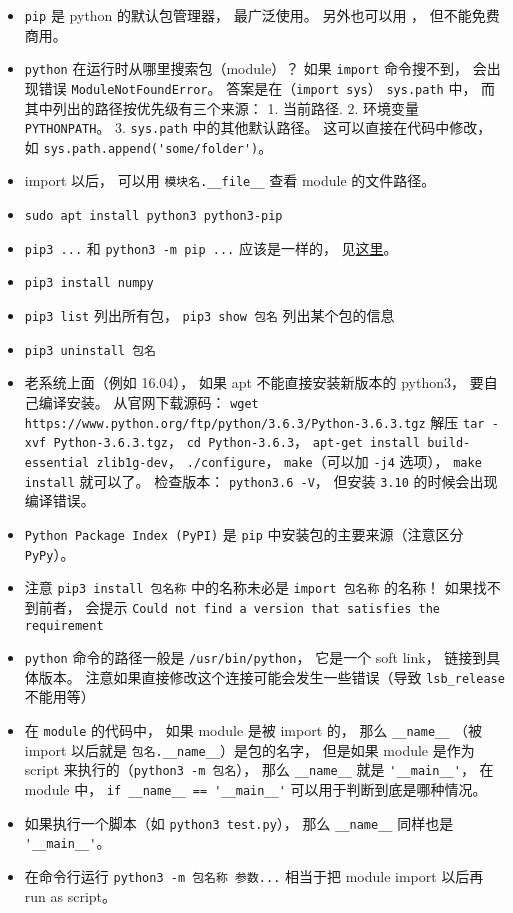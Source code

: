 

\begin{itemize}
\item \verb`pip` 是 python 的默认包管理器， 最广泛使用。 另外也可以用 ， 但不能免费商用。
\item \verb`python` 在运行时从哪里搜索包（module）？ 如果 \verb`import` 命令搜不到， 会出现错误 \verb`ModuleNotFoundError`。 答案是在（\verb`import sys`） \verb`sys.path` 中， 而其中列出的路径按优先级有三个来源： 1. 当前路径. 2. 环境变量 \verb`PYTHONPATH`。 3. \verb`sys.path` 中的其他默认路径。 这可以直接在代码中修改， 如 \verb`sys.path.append('some/folder')`。
\item import 以后， 可以用 \verb`模块名.__file__` 查看 module 的文件路径。
\item \verb`sudo apt install python3 python3-pip`
\item \verb`pip3 ...` 和 \verb`python3 -m pip ...` 应该是一样的， 见\href{https://stackoverflow.com/questions/41307101/difference-between-pip3-and-python3-m-pip}{这里}。
\item \verb`pip3 install numpy`
\item \verb`pip3 list` 列出所有包， \verb`pip3 show 包名` 列出某个包的信息
\item \verb`pip3 uninstall 包名`
\item 老系统上面（例如 16.04）， 如果 apt 不能直接安装新版本的 python3， 要自己编译安装。 从官网下载源码： \verb`wget https://www.python.org/ftp/python/3.6.3/Python-3.6.3.tgz` 解压 \verb`tar -xvf Python-3.6.3.tgz`， \verb`cd Python-3.6.3`， \verb`apt-get install build-essential zlib1g-dev`， \verb`./configure`， \verb`make`（可以加 \verb`-j4` 选项）， \verb`make install` 就可以了。 检查版本： \verb`python3.6 -V`， 但安装 \verb`3.10` 的时候会出现编译错误。
\item \verb`Python Package Index (PyPI)` 是 \verb`pip` 中安装包的主要来源（注意区分 \verb`PyPy`）。
\item 注意 \verb`pip3 install 包名称` 中的名称未必是 \verb`import 包名称` 的名称！ 如果找不到前者， 会提示 \verb`Could not find a version that satisfies the requirement`
\item \verb`python` 命令的路径一般是 \verb`/usr/bin/python`， 它是一个 soft link， 链接到具体版本。 注意如果直接修改这个连接可能会发生一些错误（导致 \verb`lsb_release` 不能用等）
\item 在 \verb`module` 的代码中， 如果 module 是被 import 的， 那么 \verb`__name__` （被 import 以后就是 \verb`包名.__name__`）是包的名字， 但是如果 module 是作为 script 来执行的（\verb`python3 -m 包名`）， 那么 \verb`__name__` 就是 \verb`'__main__'`， 在 module 中， \verb`if __name__ == '__main__'` 可以用于判断到底是哪种情况。
\item 如果执行一个脚本（如 \verb`python3 test.py`）， 那么 \verb`__name__` 同样也是 \verb`'__main__'`。
\item 在命令行运行 \verb`python3 -m 包名称 参数...` 相当于把 module import 以后再 run as script。
\end{itemize}
